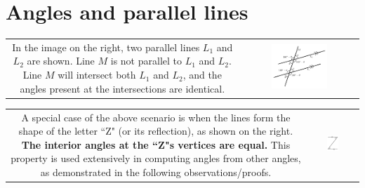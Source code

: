 \documentclass{article}
\begin{document}
\section{Angles and parallel lines}

\begin{tabular}{cc}
\parbox{0.5\textwidth}{
In the image on the right, two parallel lines \(L_1\) and \(L_2\) are shown. Line \(M\) is not parallel to \(L_1\) and \(L_2\). Line \(M\) will intersect both \(L_1\) and \(L_2\), and the angles present at the intersections are identical. 
} & 
\parbox{0.5\textwidth}{\includegraphics[width = 0.5\textwidth]{angles_and_parallel_lines}} 
\end{tabular}

\begin{tabular}{cc}
\parbox{0.5\textwidth}{
A special case of the above scenario is when the lines form the shape of the letter ``Z" (or its reflection), as shown on the right. {\bf The interior angles at the ``Z"s vertices are equal.} This  property is used extensively in computing angles from other angles, as demonstrated in the following observations/proofs.
} & 
\parbox{0.25\textwidth}{\includegraphics[width = 0.25\textwidth]{Z_angles}}
\end{tabular}
\end{document}
